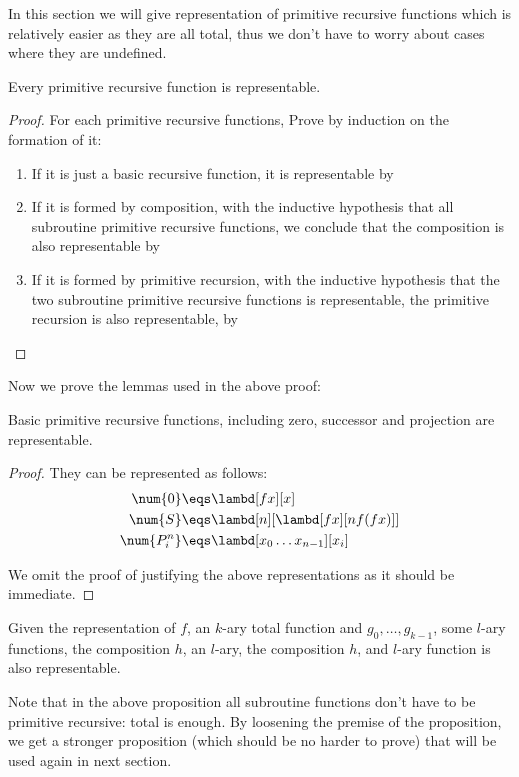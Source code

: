 \documentclass[../../../include/open-logic-section]{subfiles}
\begin{document}

In this section we will give representation of primitive recursive
functions which is relatively easier as they are all total, thus we don't have to worry about cases where they are
undefined.

\begin{prop}
  Every primitive recursive function is representable.
\end{prop}
\begin{proof}
  For each primitive recursive functions, Prove by induction on
  the formation of it:
  \begin{enumerate}
  \item If it is just a basic recursive function, it is representable by
  \item If it is formed by composition, with the inductive hypothesis that all
    subroutine primitive recursive functions, we
    conclude that the composition is also representable by
  \item If it is formed by primitive recursion, with the inductive hypothesis that the
    two subroutine primitive recursive functions is representable, the
    primitive recursion is also representable, by 
  \end{enumerate}
\end{proof}

Now we prove the lemmas used in the above proof:

\begin{lem}
  Basic primitive recursive functions, including zero, successor and
  projection are representable.
\end{lem}
\begin{proof}
  They can be represented as follows:
  \begin{align*}
    \num{0} &\eqs \lambd[fx][x]\\
    \num{S} &\eqs \lambd[n][\lambd[fx][n f (f x)]] \\
    \num{P^n_i} &\eqs \lambd[x_0\dots x_{n-1}][x_i] \\
  \end{align*}

  We omit the proof of justifying the above representations as it should
  be immediate.
\end{proof}

\begin{lem}
  Given the representation of $f$, an $k$-ary total function and $g_0,
  \dots, g_{k-1}$, some $l$-ary functions, the composition $h$, an
  $l$-ary, the composition $h$, and $l$-ary function is also representable.
\end{lem}
Note that in the above proposition all subroutine functions don't have
to be primitive recursive: total is enough. By loosening the premise
of the proposition, we get a stronger proposition (which should be no harder
to prove) that will be used again in next section.
\end{document}
